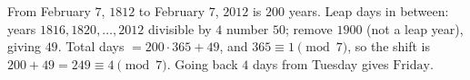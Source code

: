 From February $7$, $1812$ to February $7$, $2012$ is $200$ years. Leap days in between: years $1816,1820,\dots,2012$ divisible by $4$ number $50$; remove $1900$ (not a leap year), giving $49$. Total days $=200\cdot365+49$, and $365\equiv1\pmod7$, so the shift is $200+49=249\equiv4\pmod7$. Going back $4$ days from Tuesday gives $\boxed{\text{Friday}}$.
